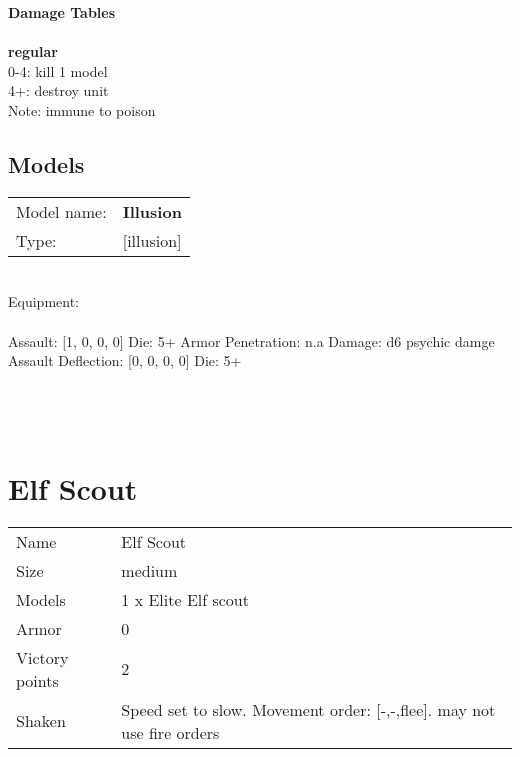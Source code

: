 {\bf Damage Tables} \\
\ \\ {\bf regular } \\
0-4: kill 1 model \\
4+: destroy unit \\
Note: immune to poison \\


\pagebreak

\subsection{ Models }

\begin{tabular}{ll}
Model name: & {\bf Illusion } \\
Type: & [illusion] \\
\end{tabular}
\ \\
Equipment:  \\
\ \\
Assault: [1, 0, 0, 0] Die: 5+ Armor Penetration: n.a Damage: d6 psychic damge \\
Assault Deflection: [0, 0, 0, 0] Die: 5+\\
\indent  
\ \\

\ \\
 
\ \\














\pagebreak\clearpage

\section{ Elf Scout }

\begin{tabular}{ll}
  Name & Elf Scout \\
  Size & medium\\
  Models & 1 x Elite Elf scout\\
  Armor & 0\\
  Victory points & 2\\
  Shaken & Speed set to slow. Movement order: [-,-,flee]. may not use fire orders\\
\end{tabular}

